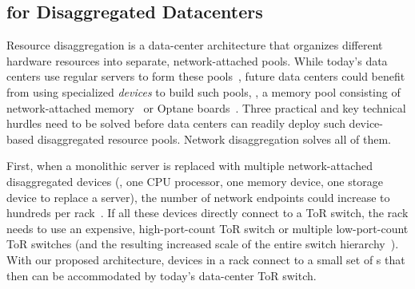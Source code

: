 \subsection{for Disaggregated Datacenters}

Resource disaggregation is a data-center architecture that organizes different hardware resources into separate, network-attached pools.
While today's data centers use regular servers to form these pools~\cite{alibaba-polardb,SnowFlake-NSDI20,Borg-eurosys20}, 
future data centers could benefit from using specialized {\em devices} to build such pools, \eg, a memory pool consisting of network-attached memory~\cite{clio-arxiv} or Optane boards~\cite{HP-TheMachine,ATC20-pDPM}.
Three practical and key technical hurdles need to be solved before data centers can readily deploy such device-based disaggregated resource pools. Network disaggregation solves all of them.



First, when a monolithic server is replaced with multiple network-attached disaggregated devices (\eg, one CPU processor, one memory device, one storage device to replace a server), the number of network endpoints could increase to hundreds per rack~\cite{shoal-nsdi19}. %
If all these devices directly connect to a ToR switch, the rack needs to use an expensive, high-port-count ToR switch or multiple low-port-count ToR switches (and the resulting increased scale of the entire switch hierarchy~\cite{zhang-nsdi19,zhao-nsdi19}).
With our proposed architecture, devices in a rack connect to a small set of \snic{}s that then can be accommodated by today's data-center ToR switch.

